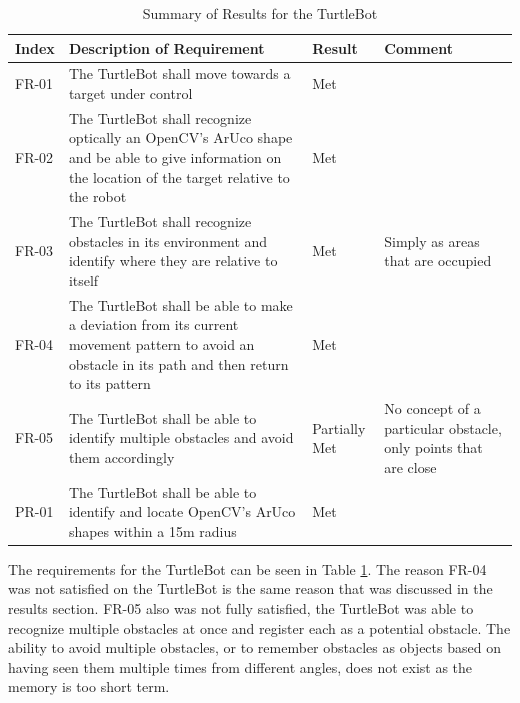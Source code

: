 \documentclass{article}[12]
\begin{document}
	\begin{table}[H]
  \small
		\begin{tabular}{p{2cm} p{8cm} p{2cm} p{3cm}} 
			\hline
			{\textbf{Index}} & {\textbf{Description of Requirement}} & {\textbf{Result}} & {\textbf{Comment}} \\ \hline
FR-01 & The TurtleBot shall move towards a target under control & Met & \\
FR-02 & The TurtleBot shall recognize optically an OpenCV's ArUco shape and be able to give information on the location of the target relative to the robot & Met & \\
FR-03 & The TurtleBot shall recognize obstacles in its environment and identify where they are relative to itself & Met & Simply as areas that are occupied \\
FR-04 & The TurtleBot shall be able to make a deviation from its current movement pattern to avoid an obstacle in its path and then return to its pattern & Met & \\
FR-05 & The TurtleBot shall be able to identify multiple obstacles and avoid them accordingly & Partially Met & No concept of a particular obstacle, only points that are close \\
PR-01 & The TurtleBot shall be able to identify and locate OpenCV's ArUco shapes within a 15m radius & Met & \\ \hline
     \end{tabular}
     \caption{Summary of Results for the TurtleBot}
     \label{table:turtlbotresults}
 \end{table}

 The requirements for the TurtleBot can be seen in Table \ref{table:turtlbotresults}. The reason FR-04 was not satisfied on the TurtleBot is the same reason that was discussed in the results section. FR-05 also was not fully satisfied, the TurtleBot was able to recognize multiple obstacles at once and register each as a potential obstacle. The ability to avoid multiple obstacles, or to remember obstacles as objects based on having seen them multiple times from different angles, does not exist as the memory is too short term.
\end{document}
